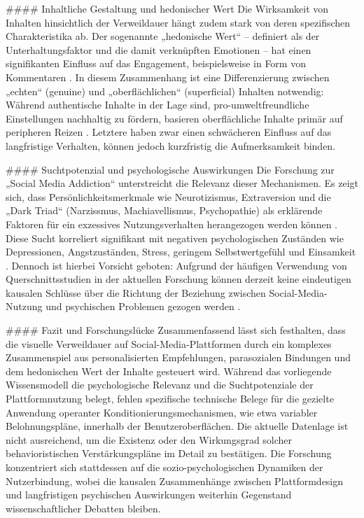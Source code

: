 \documentclass[11pt,a4paper]{article}
\begin{document}
\#\#\#\# Inhaltliche Gestaltung und hedonischer Wert Die Wirksamkeit von Inhalten hinsichtlich der Verweildauer hängt zudem stark von deren spezifischen Charakteristika ab. Der sogenannte „hedonische Wert“ – definiert als der Unterhaltungsfaktor und die damit verknüpften Emotionen – hat einen signifikanten Einfluss auf das Engagement, beispielsweise in Form von Kommentaren \autocite{openalex_W2946816985}. In diesem Zusammenhang ist eine Differenzierung zwischen „echten“ (genuine) und „oberflächlichen“ (superficial) Inhalten notwendig: Während authentische Inhalte in der Lage sind, pro-umweltfreundliche Einstellungen nachhaltig zu fördern, basieren oberflächliche Inhalte primär auf peripheren Reizen \autocite{doaj_1ebaf951e0734f32b8da2689a45a3dfd}. Letztere haben zwar einen schwächeren Einfluss auf das langfristige Verhalten, können jedoch kurzfristig die Aufmerksamkeit binden.

\#\#\#\# Suchtpotenzial und psychologische Auswirkungen Die Forschung zur „Social Media Addiction“ unterstreicht die Relevanz dieser Mechanismen. Es zeigt sich, dass Persönlichkeitsmerkmale wie Neurotizismus, Extraversion und die „Dark Triad“ (Narzissmus, Machiavellismus, Psychopathie) als erklärende Faktoren für ein exzessives Nutzungsverhalten herangezogen werden können \autocite{doaj_10febcbb5e60420699a1d4570a075832}. Diese Sucht korreliert signifikant mit negativen psychologischen Zuständen wie Depressionen, Angstzuständen, Stress, geringem Selbstwertgefühl und Einsamkeit \autocite{doaj_10febcbb5e60420699a1d4570a075832,openalex_W2924664363}. Dennoch ist hierbei Vorsicht geboten: Aufgrund der häufigen Verwendung von Querschnittsstudien in der aktuellen Forschung können derzeit keine eindeutigen kausalen Schlüsse über die Richtung der Beziehung zwischen Social-Media-Nutzung und psychischen Problemen gezogen werden \autocite{openalex_W2924664363}.

\#\#\#\# Fazit und Forschungslücke Zusammenfassend lässt sich festhalten, dass die visuelle Verweildauer auf Social-Media-Plattformen durch ein komplexes Zusammenspiel aus personalisierten Empfehlungen, parasozialen Bindungen und dem hedonischen Wert der Inhalte gesteuert wird. Während das vorliegende Wissensmodell die psychologische Relevanz und die Suchtpotenziale der Plattformnutzung belegt, fehlen spezifische technische Belege für die gezielte Anwendung operanter Konditionierungsmechanismen, wie etwa variabler Belohnungspläne, innerhalb der Benutzeroberflächen. Die aktuelle Datenlage ist nicht ausreichend, um die Existenz oder den Wirkungsgrad solcher behavioristischen Verstärkungspläne im Detail zu bestätigen. Die Forschung konzentriert sich stattdessen auf die sozio-psychologischen Dynamiken der Nutzerbindung, wobei die kausalen Zusammenhänge zwischen Plattformdesign und langfristigen psychischen Auswirkungen weiterhin Gegenstand wissenschaftlicher Debatten bleiben.
\end{document}
